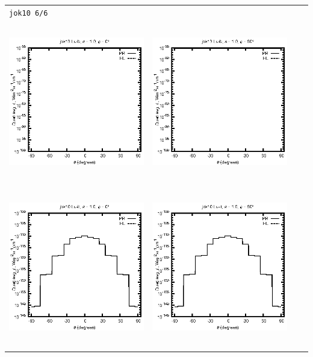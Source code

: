 \begin{tabular}{c c c c}
\multicolumn{4}{l}{\texttt{jok10 6/6}} \\
\includegraphics[height=7cm]{../eps/jok10_Lu_b_fwd.eps} &
\includegraphics[height=7cm]{../eps/jok10_Lu_b_cross.eps} \\
\includegraphics[height=7cm]{../eps/jok10_Lu_it_fwd.eps} &
\includegraphics[height=7cm]{../eps/jok10_Lu_it_cross.eps} \\

\end{tabular}

